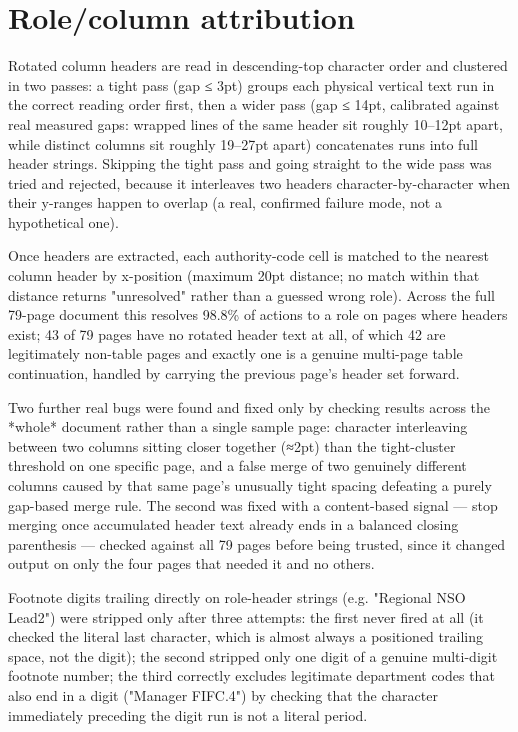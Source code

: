 \section{Role/column attribution}
Rotated column headers are read in descending-top character order and clustered in two passes: a tight pass (gap ≤ 3pt) groups each physical vertical text run in the correct reading order first, then a wider pass (gap ≤ 14pt, calibrated against real measured gaps: wrapped lines of the same header sit roughly 10–12pt apart, while distinct columns sit roughly 19–27pt apart) concatenates runs into full header strings. Skipping the tight pass and going straight to the wide pass was tried and rejected, because it interleaves two headers character-by-character when their y-ranges happen to overlap (a real, confirmed failure mode, not a hypothetical one).

Once headers are extracted, each authority-code cell is matched to the nearest column header by x-position (maximum 20pt distance; no match within that distance returns "unresolved" rather than a guessed wrong role). Across the full 79-page document this resolves 98.8\% of actions to a role on pages where headers exist; 43 of 79 pages have no rotated header text at all, of which 42 are legitimately non-table pages and exactly one is a genuine multi-page table continuation, handled by carrying the previous page's header set forward.

Two further real bugs were found and fixed only by checking results across the *whole* document rather than a single sample page: character interleaving between two columns sitting closer together (≈2pt) than the tight-cluster threshold on one specific page, and a false merge of two genuinely different columns caused by that same page's unusually tight spacing defeating a purely gap-based merge rule. The second was fixed with a content-based signal — stop merging once accumulated header text already ends in a balanced closing parenthesis — checked against all 79 pages before being trusted, since it changed output on only the four pages that needed it and no others.

Footnote digits trailing directly on role-header strings (e.g. "Regional NSO Lead2") were stripped only after three attempts: the first never fired at all (it checked the literal last character, which is almost always a positioned trailing space, not the digit); the second stripped only one digit of a genuine multi-digit footnote number; the third correctly excludes legitimate department codes that also end in a digit ("Manager FIFC.4") by checking that the character immediately preceding the digit run is not a literal period.

